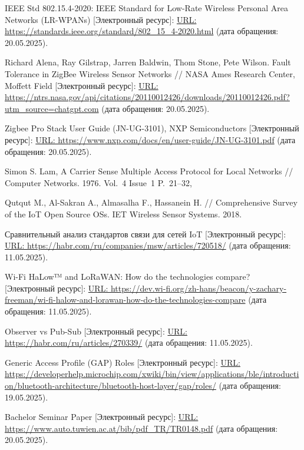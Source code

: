 \documentclass[14pt, a4paper]{extreport}
\begin{document}
\begin{thebibliography}{40}
 IEEE Std 802.15.4-2020: IEEE Standard for Low-Rate Wireless Personal Area Networks (LR-WPANs) [Электронный ресурс]: \url{URL: https://standards.ieee.org/standard/802_15_4-2020.html} (дата обращения: 20.05.2025).

 Richard Alena, Ray Gilstrap, Jarren Baldwin, Thom Stone, Pete Wilson. Fault Tolerance in ZigBee Wireless Sensor Networks // NASA Ames Research Center, Moffett Field [Электронный ресурс]: \url{URL: https://ntrs.nasa.gov/api/citations/20110012426/downloads/20110012426.pdf?utm_source=chatgpt.com} (дата обращения: 20.05.2025).



 Zigbee Pro Stack User Guide (JN-UG-3101), NXP Semiconductors [Электронный ресурс]: \url{URL: https://www.nxp.com/docs/en/user-guide/JN-UG-3101.pdf} (дата обращения: 20.05.2025).

 Simon S. Lam, A Carrier Sense Multiple Access Protocol for Local Networks // Computer Networks. 1976. Vol.~4 Issue~1 P.~21--32,

 Qutqut M., Al-Sakran A., Almasalha F., Hassanein H. // Comprehensive Survey of the IoT Open Source OSs. IET Wireless Sensor Systems. 2018.

 Сравнительный анализ стандартов связи для сетей IoT [Электронный ресурс]: \url{URL: https://habr.com/ru/companies/msw/articles/720518/} (дата обращения: 11.05.2025).

 Wi-Fi HaLow™ and LoRaWAN: How do the technologies compare? [Электронный ресурс]: \url{URL: https://dev.wi-fi.org/zh-hans/beacon/y-zachary-freeman/wi-fi-halow-and-lorawan-how-do-the-technologies-compare} (дата обращения: 11.05.2025).

 Observer vs Pub-Sub [Электронный ресурс]: \url{URL: https://habr.com/ru/articles/270339/} (дата обращения: 11.05.2025).

 Generic Access Profile (GAP) Roles [Электронный ресурс]: \url{URL: https://developerhelp.microchip.com/xwiki/bin/view/applications/ble/introduction/bluetooth-architecture/bluetooth-host-layer/gap/roles/} (дата обращения: 19.05.2025).

 Bachelor Seminar Paper  [Электронный ресурс]: \url{URL: https://www.auto.tuwien.ac.at/bib/pdf_TR/TR0148.pdf} (дата обращения: 20.05.2025).

\end{thebibliography}
\end{document}
